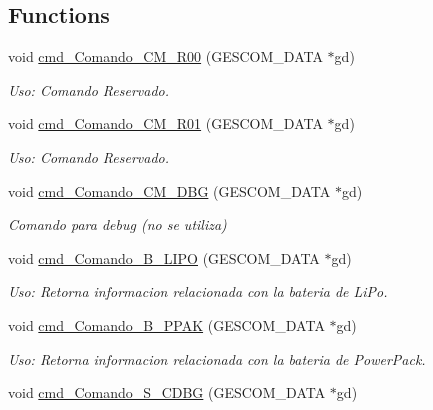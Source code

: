 \subsection*{Functions}
\begin{DoxyCompactItemize}
\item 
void \hyperlink{_gescom___m_e_g_a2560___v3___interfaz_8ino_aac57c6579cefb2d3ef3d759b7eb17792}{cmd\+\_\+\+Comando\+\_\+\+C\+M\+\_\+\+R00} (G\+E\+S\+C\+O\+M\+\_\+\+D\+A\+TA $\ast$gd)
\begin{DoxyCompactList}\small\item\em Uso\+: Comando Reservado. \end{DoxyCompactList}\item 
void \hyperlink{_gescom___m_e_g_a2560___v3___interfaz_8ino_aac7d395a871b2c8a45e0f878632d2521}{cmd\+\_\+\+Comando\+\_\+\+C\+M\+\_\+\+R01} (G\+E\+S\+C\+O\+M\+\_\+\+D\+A\+TA $\ast$gd)
\begin{DoxyCompactList}\small\item\em Uso\+: Comando Reservado. \end{DoxyCompactList}\item 
void \hyperlink{_gescom___m_e_g_a2560___v3___interfaz_8ino_a4279cb7dd4b63a73a3fcf44390b82e54}{cmd\+\_\+\+Comando\+\_\+\+C\+M\+\_\+\+D\+BG} (G\+E\+S\+C\+O\+M\+\_\+\+D\+A\+TA $\ast$gd)
\begin{DoxyCompactList}\small\item\em Comando para debug (no se utiliza) \end{DoxyCompactList}\item 
void \hyperlink{_gescom___m_e_g_a2560___v3___interfaz_8ino_a98aff49bf403ccb006895c0443025536}{cmd\+\_\+\+Comando\+\_\+\+B\+\_\+\+L\+I\+PO} (G\+E\+S\+C\+O\+M\+\_\+\+D\+A\+TA $\ast$gd)
\begin{DoxyCompactList}\small\item\em Uso\+: Retorna informacion relacionada con la bateria de Li\+Po. \end{DoxyCompactList}\item 
void \hyperlink{_gescom___m_e_g_a2560___v3___interfaz_8ino_a337a7577f586434b2b72595b1d401f0e}{cmd\+\_\+\+Comando\+\_\+\+B\+\_\+\+P\+P\+AK} (G\+E\+S\+C\+O\+M\+\_\+\+D\+A\+TA $\ast$gd)
\begin{DoxyCompactList}\small\item\em Uso\+: Retorna informacion relacionada con la bateria de Power\+Pack. \end{DoxyCompactList}\item 
void \hyperlink{_gescom___m_e_g_a2560___v3___interfaz_8ino_aad1a82b3f1bc9fc116cf8a05ae4712b4}{cmd\+\_\+\+Comando\+\_\+\+S\+\_\+\+C\+D\+BG} (G\+E\+S\+C\+O\+M\+\_\+\+D\+A\+TA $\ast$gd)

\end{DoxyCompactItemize}
